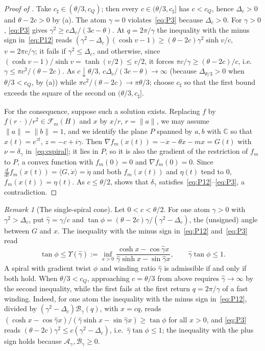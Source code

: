 \documentclass[11pt]{article}
\theoremstyle{definition}
\theoremstyle{remark}
\newtheorem{remark}[theorem]{Remark}
\newcommand{\C}{\mathbb C}
\newcommand{\cF}{\mathcal F}
\newcommand{\cA}{\mathcal A}
\newcommand{\cB}{\mathcal B}
\newcommand{\ch}{\cosh}
\newcommand{\sh}{\sinh}
\newcommand{\ip}[2]{\langle #1,#2\rangle}
\newcommand{\norm}[1]{\lVert #1\rVert}
\newcommand{\cQ}{c_{Q}}
\newcommand{\cFm}{\cF_m}
\begin{document}
\begin{proof}[Proof of ]
Take \(c_\sharp\in(\theta/3,\cQ)\); then every \(c\in(\theta/3,c_\sharp]\) has \(c<\cQ\), hence
\(\Delta_c>0\) and \(\theta-2c>0\) by (a).  The atom \(\gamma=0\) violates~\eqref{eq:P3} because \(\Delta_c>0\).  For \(\gamma>0\),
\eqref{eq:P3} gives \(\gamma^2\ge c\Delta_c/(3c-\theta)\).  At \(q=2\pi/\gamma\) the
inequality with the minus sign in~\eqref{eq:P12} reads
\((\gamma^2-\Delta_c)(\ch v-1)\ge(\theta-2c)\gamma^2\sh v/c\), \(v=2\pi c/\gamma\); it fails if
\(\gamma^2\le\Delta_c\), and otherwise, since \((\ch v-1)/\sh v=\tanh(v/2)\le v/2\), it
forces \(\pi c/\gamma\ge(\theta-2c)/c\), i.e.\ \(\gamma\le\pi c^2/(\theta-2c)\).  As
\(c\downarrow\theta/3\), \(c\Delta_c/(3c-\theta)\to\infty\) (because
\(\Delta_{\theta/3}>0\) when \(\theta/3<\cQ\), by (a)) while \(\pi c^2/(\theta-2c)\to\pi\theta/3\); choose
\(c_\sharp\) so that the first bound exceeds the square of the second on
\((\theta/3,c_\sharp]\).

For the consequence, suppose such a solution exists.  Replacing \(f\) by \(f(r\,\cdot)/r^2\in\cFm(H)\)
and \(x\) by \(x/r\), \(r=\norm a\), we may assume \(\norm a=\norm b=1\), and we identify the plane \(P\) spanned
by \(a,b\) with \(\C\) so that \(x(t)=e^{zt}\), \(z=-c+i\gamma\).  Then
\(\nabla f_m(x(t))=-\ddot x-\theta\dot x-mx=G(t)\) with \(\nu=\delta_\gamma\) in~\eqref{eq:cspiral}; it lies in \(P\), so it is also the
gradient of the restriction of \(f_m\) to \(P\), a convex function with \(f_m(0)=0\) and \(\nabla f_m(0)=0\).
Since \(\frac d{dt}f_m(x(t))=\ip{G}{\dot x}=\dot\eta\) and both \(f_m(x(t))\) and \(\eta(t)\) tend to \(0\), \(f_m(x(t))=\eta(t)\).  As \(c\le\theta/2\),
 shows that \(\delta_\gamma\) satisfies~\eqref{eq:P12}--\eqref{eq:P3}, a contradiction.
\end{proof}

\begin{remark}[The single-spiral cone]\label{rem:cone}
Let \(0<c<\theta/2\).  For one atom \(\gamma>0\) with \(\gamma^2>\Delta_c\), put
\(\hat\gamma=\gamma/c\) and \(\tan\phi=(\theta-2c)\gamma/(\gamma^2-\Delta_c)\), the (unsigned) angle between \(G\) and \(x\).
The inequality with the minus sign in~\eqref{eq:P12} and~\eqref{eq:P3} read
\[
\tan\phi\le\Upsilon(\hat\gamma):=\inf_{x>0}\frac{\ch x-\cos\hat\gamma x}{\hat\gamma\sh x-\sin\hat\gamma x},\qquad
\hat\gamma\tan\phi\le1 .
\]
A spiral with gradient twist \(\phi\) and winding ratio \(\hat\gamma\) is
admissible if and only if both hold.  When \(\theta/3<\cQ\), approaching
\(c=\theta/3\) from above requires
\(\hat\gamma\to\infty\) by the second inequality, while the first fails at
the first return \(q=2\pi/\gamma\) of a fast winding.  Indeed, for one atom the inequality with the minus sign
in~\eqref{eq:P12}, divided by \((\gamma^2-\Delta_c)\cB_\gamma(q)\), with \(x=cq\), reads
\((\ch x-\cos\hat\gamma x)/(\hat\gamma\sh x-\sin\hat\gamma x)\ge\tan\phi\) for all \(x>0\), and
\eqref{eq:P3} reads \((\theta-2c)\gamma^2\le c(\gamma^2-\Delta_c)\), i.e.\
\(\hat\gamma\tan\phi\le1\); the inequality with the plus sign holds because \(\cA_\gamma,\cB_\gamma\ge0\).
\end{remark}
\end{document}
